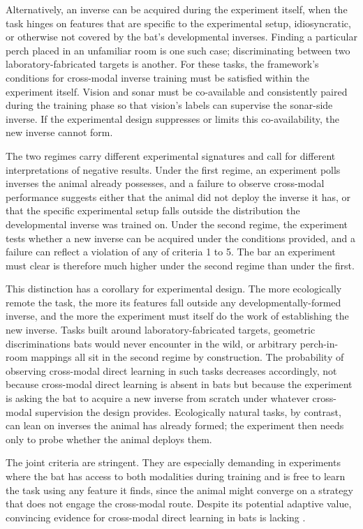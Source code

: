 \documentclass[11pt]{article}
\begin{document}
Alternatively, an inverse can be acquired during the experiment itself, when the task hinges on features that are specific to the experimental setup, idiosyncratic, or otherwise not covered by the bat's developmental inverses. Finding a particular perch placed in an unfamiliar room is one such case; discriminating between two laboratory-fabricated targets is another. For these tasks, the framework's conditions for cross-modal inverse training must be satisfied within the experiment itself. Vision and sonar must be co-available and consistently paired during the training phase so that vision's labels can supervise the sonar-side inverse. If the experimental design suppresses or limits this co-availability, the new inverse cannot form.


The two regimes carry different experimental signatures and call for different interpretations of negative results. Under the first regime, an experiment polls inverses the animal already possesses, and a failure to observe cross-modal performance suggests either that the animal did not deploy the inverse it has, or that the specific experimental setup falls outside the distribution the developmental inverse was trained on. Under the second regime, the experiment tests whether a new inverse can be acquired under the conditions provided, and a failure can reflect a violation of any of criteria 1 to 5. The bar an experiment must clear is therefore much higher under the second regime than under the first.


This distinction has a corollary for experimental design. The more ecologically remote the task, the more its features fall outside any developmentally-formed inverse, and the more the experiment must itself do the work of establishing the new inverse. Tasks built around laboratory-fabricated targets, geometric discriminations bats would never encounter in the wild, or arbitrary perch-in-room mappings all sit in the second regime by construction. The probability of observing cross-modal direct learning in such tasks decreases accordingly, not because cross-modal direct learning is absent in bats but because the experiment is asking the bat to acquire a new inverse from scratch under whatever cross-modal supervision the design provides. Ecologically natural tasks, by contrast, can lean on inverses the animal has already formed; the experiment then needs only to probe whether the animal deploys them.


The joint criteria are stringent. They are especially demanding in experiments where the bat has access to both modalities during training and is free to learn the task using any feature it finds, since the animal might converge on a strategy that does not engage the cross-modal route. Despite its potential adaptive value, convincing evidence for cross-modal direct learning in bats is lacking \citep[see also][]{Page2021}.
\end{document}

